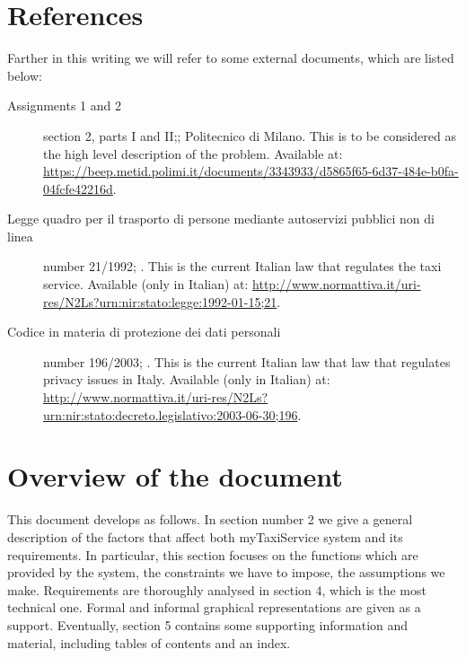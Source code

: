 \section{References}	

Farther in this writing we will refer to some external documents, which are listed below:
\begin{description}
	\item [Assignments 1 and 2] section 2, parts I and II;; Politecnico di Milano. This is to be considered as the high level description of the problem. Available at: \url{https://beep.metid.polimi.it/documents/3343933/d5865f65-6d37-484e-b0fa-04fcfe42216d}.
	\item [Legge quadro per il trasporto di persone mediante autoservizi pubblici non di linea] number 21/1992; . This is the current Italian law that regulates the taxi service. Available (only in Italian) at: \url{http://www.normattiva.it/uri-res/N2Ls?urn:nir:stato:legge:1992-01-15;21}.
	\item [Codice in materia di protezione dei dati personali] number 196/2003; . This is the current Italian law that law that regulates privacy issues in Italy. Available (only in Italian) at: \url{http://www.normattiva.it/uri-res/N2Ls?urn:nir:stato:decreto.legislativo:2003-06-30;196}.
\end{description}




\section{Overview of the document}	 

This document develops as follows. In section number 2 we give a general description of the factors that affect both myTaxiService system and its requirements. In particular, this section focuses on the functions which are provided by the system, the constraints we have to impose, the assumptions we make. Requirements are thoroughly analysed in section 4, which is the most technical one. Formal and informal graphical representations are given as a support. Eventually, section 5 contains some supporting information and material, including tables of contents and an index.



